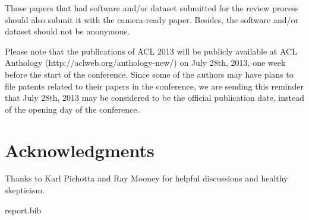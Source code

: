 \documentclass[11pt]{article}
\begin{document}
Those papers that had software and/or dataset submitted for the review process
should also submit it 
with the camera-ready paper. Besides, the software and/or dataset should not be
anonymous. 

Please note that the publications of ACL 2013 will be publicly available at ACL
Anthology 
(http://aclweb.org/anthology-new/) on July 28th, 2013, one week before the start
of the conference. 
Since some of the authors may have plans to file patents related to their papers
in the conference, 
we are sending this reminder that July 28th, 2013 may be considered to be the
official publication date, 
instead of the opening day of the conference.

\section*{Acknowledgments}

Thanks to Karl Pichotta and Ray Mooney for helpful discussions and healthy
skepticism.


report.bib

\end{document}
